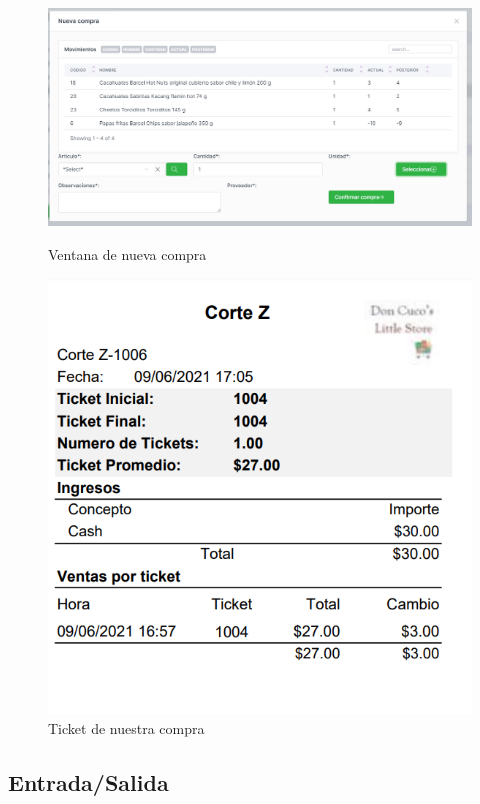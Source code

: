 \documentclass[a4paper,DIV=12]{scrreprt}
\begin{document}
	\begin{figure}[!htb]
		\centering
		\includegraphics[scale=0.4]{NUEVACOMPRA.PNG}\\
		\caption{Ventana de nueva compra}
	\end{figure}
	\begin{figure}[!htb]
		\centering
		\includegraphics[scale=0.4]{CORTECAJA.PNG}
		\caption{Ticket de nuestra compra}
	\end{figure}
	
\clearpage

\subsection{Entrada/Salida}
\end{document}
